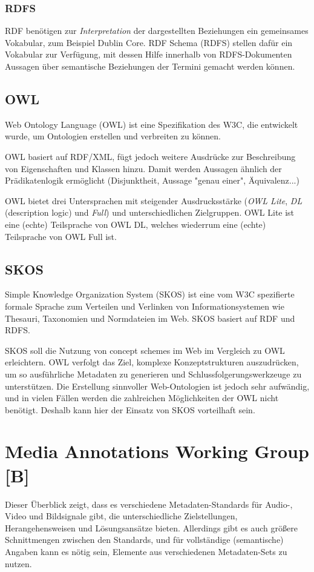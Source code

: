 	\subsubsection{RDFS}
	RDF benötigen zur \emph{Interpretation} der dargestellten Beziehungen ein gemeinsames Vokabular, zum Beispiel Dublin Core. RDF Schema (RDFS) stellen dafür ein Vokabular zur Verfügung, mit dessen Hilfe innerhalb von RDFS-Dokumenten Aussagen über semantische Beziehungen der Termini gemacht werden können.

	\subsection{OWL\cite{W3C:2004:OWL}}
	Web Ontology Language (OWL) ist eine Spezifikation des W3C, die entwickelt wurde, um Ontologien erstellen und verbreiten zu können.
	
	OWL basiert auf RDF/XML, fügt jedoch weitere Ausdrücke zur Beschreibung von Eigenschaften und Klassen hinzu. Damit werden Aussagen ähnlich der Prädikatenlogik ermöglicht (Disjunktheit, Aussage "genau einer", Äquivalenz...)
	
	OWL bietet drei Untersprachen mit steigender Ausdrucksstärke (\emph{OWL Lite}, \emph{DL} (description logic) und \emph{Full}) und unterschiedlichen Zielgruppen. OWL Lite ist eine (echte) Teilsprache von OWL DL, welches wiederrum eine (echte) Teilsprache von OWL Full ist.
	
	\subsection{SKOS\cite{W3C:2009:SKOS}}
	Simple Knowledge Organization System (SKOS) ist eine vom W3C spezifierte formale Sprache zum Verteilen und Verlinken von Informationsystemen wie Thesauri, Taxonomien und Normdateien im Web. SKOS basiert auf RDF und RDFS.
		
	SKOS soll die Nutzung von concept schemes im Web im Vergleich zu OWL erleichtern. OWL verfolgt das Ziel, komplexe Konzeptstrukturen auszudrücken, um so ausführliche Metadaten zu generieren und Schlussfolgerungswerkzeuge zu unterstützen. Die Erstellung sinnvoller Web-Ontologien ist jedoch sehr aufwändig, und in vielen Fällen werden die zahlreichen Möglichkeiten der OWL nicht benötigt. Deshalb kann hier der Einsatz von SKOS vorteilhaft sein.\cite{WP:2011:SKOS}

	\section{Media Annotations Working Group \hfill [B]}
	Dieser Überblick zeigt, dass es verschiedene Metadaten-Standards für Audio-, Video und Bildsignale gibt, die unterschiedliche Zielstellungen, Herangehensweisen und Lösungsansätze bieten. Allerdings gibt es auch größere Schnittmengen zwischen den Standards, und für vollständige (semantische) Angaben kann es nötig sein, Elemente aus verschiedenen Metadaten-Sets zu nutzen.
	
